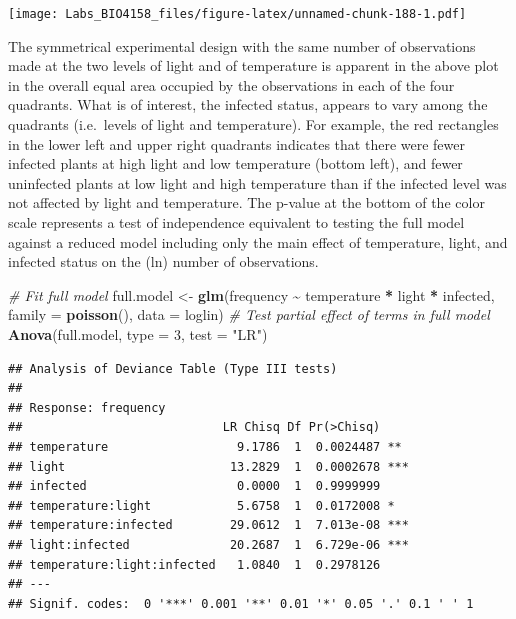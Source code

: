 \documentclass[
  12pt,
]{book}
\newenvironment{Shaded}{\begin{snugshade}}{\end{snugshade}}
\newcommand{\CommentTok}[1]{\textcolor[rgb]{0.56,0.35,0.01}{\textit{#1}}}
\newcommand{\DataTypeTok}[1]{\textcolor[rgb]{0.13,0.29,0.53}{#1}}
\newcommand{\DecValTok}[1]{\textcolor[rgb]{0.00,0.00,0.81}{#1}}
\newcommand{\KeywordTok}[1]{\textcolor[rgb]{0.13,0.29,0.53}{\textbf{#1}}}
\newcommand{\NormalTok}[1]{#1}
\newcommand{\OperatorTok}[1]{\textcolor[rgb]{0.81,0.36,0.00}{\textbf{#1}}}
\newcommand{\StringTok}[1]{\textcolor[rgb]{0.31,0.60,0.02}{#1}}
\begin{document}
\texttt{[image: Labs\_BIO4158\_files/figure-latex/unnamed-chunk-188-1.pdf]}

The symmetrical experimental design with the same number of observations made at the two levels of light and of temperature is apparent in the above plot in the overall equal area occupied by the observations in each of the four quadrants. What is of interest, the infected status, appears to vary among the quadrants (i.e.~levels of light and temperature). For example, the red rectangles in the lower left and upper right quadrants indicates that there were fewer infected plants at high light and low temperature (bottom left), and fewer uninfected plants at low light and high temperature than if the infected level was not affected by light and temperature. The p-value at the bottom of the color scale represents a test of independence equivalent to testing the full model against a reduced model including only the main effect of temperature, light, and infected status on the (ln) number of observations.

\begin{Shaded}
\begin{Highlighting}[]
\CommentTok{\# Fit full model}
\NormalTok{full.model \textless{}{-}}\StringTok{ }\KeywordTok{glm}\NormalTok{(frequency }\OperatorTok{\textasciitilde{}}\StringTok{ }\NormalTok{temperature }\OperatorTok{*}\StringTok{ }\NormalTok{light }\OperatorTok{*}\StringTok{ }\NormalTok{infected, }\DataTypeTok{family =} \KeywordTok{poisson}\NormalTok{(), }\DataTypeTok{data =}\NormalTok{ loglin)}
\CommentTok{\# Test partial effect of terms in full model}
\KeywordTok{Anova}\NormalTok{(full.model, }\DataTypeTok{type =} \DecValTok{3}\NormalTok{, }\DataTypeTok{test =} \StringTok{"LR"}\NormalTok{)}
\end{Highlighting}
\end{Shaded}

\begin{verbatim}
## Analysis of Deviance Table (Type III tests)
## 
## Response: frequency
##                            LR Chisq Df Pr(>Chisq)    
## temperature                  9.1786  1  0.0024487 ** 
## light                       13.2829  1  0.0002678 ***
## infected                     0.0000  1  0.9999999    
## temperature:light            5.6758  1  0.0172008 *  
## temperature:infected        29.0612  1  7.013e-08 ***
## light:infected              20.2687  1  6.729e-06 ***
## temperature:light:infected   1.0840  1  0.2978126    
## ---
## Signif. codes:  0 '***' 0.001 '**' 0.01 '*' 0.05 '.' 0.1 ' ' 1
\end{verbatim}
\end{document}
